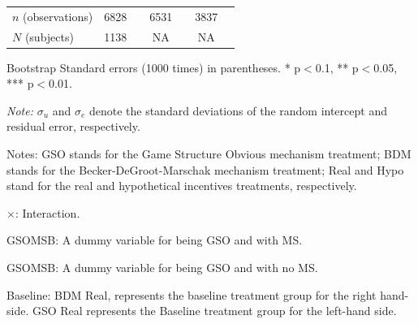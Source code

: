 \documentclass[12pt]{article}
\begin{document}
\begin{table}[H]
{\begin{tabular}{l*{3}{cc}}
\hline
\(n\) (observations)      &        6828         &            &        6531         &            &        3837         &            \\

\(N\) (subjects)       &        1138         &            &       NA         &            &        NA       &            \\
\hline\hline
\end{tabular}
}


\begin{tablenotes}
            \footnotesize
            \item Bootstrap Standard errors (1000 times) in parentheses. * p$<$0.1, ** p$<$0.05, *** p$<$0.01.
            \item \textit{Note:} $\sigma_u$ and $\sigma_e$ denote the standard deviations of the random intercept and residual error, respectively.
            \item Notes: GSO stands for the Game Structure Obvious mechanism treatment; BDM stands for the Becker-DeGroot-Marschak mechanism treatment; Real and Hypo stand for the real and hypothetical incentives treatments, respectively.
           \item $\times$: Interaction.
           \item GSOMSB: A dummy variable for being GSO and with MS.
           \item GSOMSB: A dummy variable for being GSO and with no MS.
           \item Baseline: BDM Real, represents the baseline treatment group for the right hand-side.
           GSO Real represents the Baseline treatment group for the left-hand side.
        \end{tablenotes}

\end{table}

\clearpage
\end{document}

